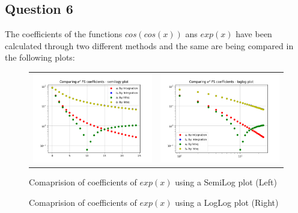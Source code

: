 \documentclass[11pt, a4paper]{article}
\begin{document}
            
            \subsection{Question 6}
           The coefficients of the functions $cos(cos(x))$ ans $exp(x)$ have been calculated through two different methods and the same are being compared in the following plots:
             \begin{figure}[H]
                    \centering
                    \setlength\tabcolsep{2pt}
                    \begin{tabular}{cc}
                       \includegraphics[scale=0.5]{Figure 3.1.png} &
                       \includegraphics[scale=0.5]{Figure 4.1.png}
                    \end{tabular}
                    \caption{Comaprision of coefficients of $exp(x)$ using a SemiLog plot (Left)}
                    \caption{Comaprision of coefficients of $exp(x)$ using a LogLog plot (Right)}
                \end{figure}
                
\end{document}

